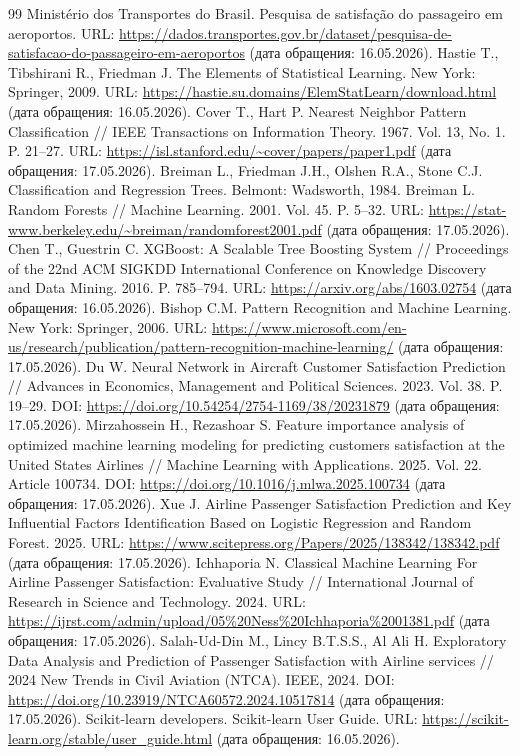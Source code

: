 \documentclass[14pt,a4paper]{extreport}
\begin{document}
\begin{thebibliography}{99}
 Ministério dos Transportes do Brasil. Pesquisa de satisfação do passageiro em aeroportos. URL: \url{https://dados.transportes.gov.br/dataset/pesquisa-de-satisfacao-do-passageiro-em-aeroportos} (дата обращения: 16.05.2026).
 Hastie T., Tibshirani R., Friedman J. The Elements of Statistical Learning. New York: Springer, 2009. URL: \url{https://hastie.su.domains/ElemStatLearn/download.html} (дата обращения: 16.05.2026).
 Cover T., Hart P. Nearest Neighbor Pattern Classification // IEEE Transactions on Information Theory. 1967. Vol. 13, No. 1. P. 21--27. URL: \url{https://isl.stanford.edu/~cover/papers/paper1.pdf} (дата обращения: 17.05.2026).
 Breiman L., Friedman J.H., Olshen R.A., Stone C.J. Classification and Regression Trees. Belmont: Wadsworth, 1984.
 Breiman L. Random Forests // Machine Learning. 2001. Vol. 45. P. 5--32. URL: \url{https://stat-www.berkeley.edu/~breiman/randomforest2001.pdf} (дата обращения: 17.05.2026).
 Chen T., Guestrin C. XGBoost: A Scalable Tree Boosting System // Proceedings of the 22nd ACM SIGKDD International Conference on Knowledge Discovery and Data Mining. 2016. P. 785--794. URL: \url{https://arxiv.org/abs/1603.02754} (дата обращения: 16.05.2026).
 Bishop C.M. Pattern Recognition and Machine Learning. New York: Springer, 2006. URL: \url{https://www.microsoft.com/en-us/research/publication/pattern-recognition-machine-learning/} (дата обращения: 17.05.2026).
 Du W. Neural Network in Aircraft Customer Satisfaction Prediction // Advances in Economics, Management and Political Sciences. 2023. Vol. 38. P. 19--29. DOI: \url{https://doi.org/10.54254/2754-1169/38/20231879} (дата обращения: 17.05.2026).
 Mirzahossein H., Rezashoar S. Feature importance analysis of optimized machine learning modeling for predicting customers satisfaction at the United States Airlines // Machine Learning with Applications. 2025. Vol. 22. Article 100734. DOI: \url{https://doi.org/10.1016/j.mlwa.2025.100734} (дата обращения: 17.05.2026).
 Xue J. Airline Passenger Satisfaction Prediction and Key Influential Factors Identification Based on Logistic Regression and Random Forest. 2025. URL: \url{https://www.scitepress.org/Papers/2025/138342/138342.pdf} (дата обращения: 17.05.2026).
 Ichhaporia N. Classical Machine Learning For Airline Passenger Satisfaction: Evaluative Study // International Journal of Research in Science and Technology. 2024. URL: \url{https://ijrst.com/admin/upload/05%20Ness%20Ichhaporia%2001381.pdf} (дата обращения: 17.05.2026).
 Salah-Ud-Din M., Lincy B.T.S.S., Al Ali H. Exploratory Data Analysis and Prediction of Passenger Satisfaction with Airline services // 2024 New Trends in Civil Aviation (NTCA). IEEE, 2024. DOI: \url{https://doi.org/10.23919/NTCA60572.2024.10517814} (дата обращения: 17.05.2026).
 Scikit-learn developers. Scikit-learn User Guide. URL: \url{https://scikit-learn.org/stable/user_guide.html} (дата обращения: 16.05.2026).
\end{thebibliography}
\end{document}
